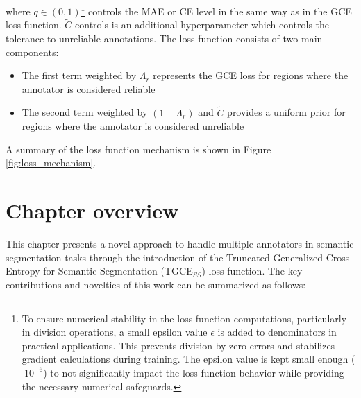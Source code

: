 where $q \in (0,1)$\footnote{
  To ensure numerical stability in the loss function computations,
  particularly in division operations, a small epsilon value $\epsilon$
  is added to denominators in practical applications. This prevents
  division by zero errors and stabilizes gradient calculations during
  training. The epsilon value is kept small enough ($~10^{-6}$) to not
  significantly impact the loss function behavior while providing the
  necessary numerical safeguards.
} controls the \gls{MAE} or \gls{CE} level in the
same way as in the \gls{GCE} loss function. $\tilde C$ controls is an additional
hyperparameter which controls the tolerance to unreliable annotations.
The loss function consists of two main components:

\begin{itemize}
  \item The first term weighted by $\Lambda_r$ represents the GCE
    loss for regions where the annotator is considered reliable
  \item The second term weighted by $(1-\Lambda_r)$ and $\tilde C$ provides a
    uniform prior for regions where the annotator is considered unreliable
\end{itemize}

A summary of the loss function mechanism is shown in Figure
\ref{fig:loss_mechanism}.



\section{Chapter overview}

This chapter presents a novel approach to handle multiple annotators
in semantic segmentation tasks through the introduction of the
Truncated Generalized Cross Entropy for Semantic Segmentation
(TGCE$_{SS}$) loss function. The key contributions and novelties of
this work can be summarized as follows:

